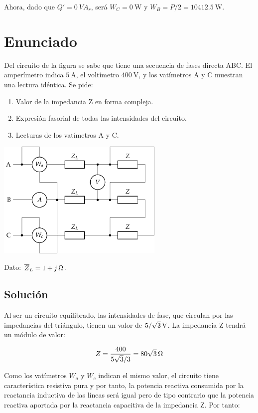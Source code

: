 Ahora, dado que $Q' = \SI{0}{VA}_r$, será $W_C = \SI{0}{\watt}$ y
$W_B = P/2 = \SI{10412.5}{\watt}$.



\section{Enunciado}

Del circuito de la figura se sabe que tiene una secuencia de fases
directa ABC. El amperímetro indica $\SI{5}{\ampere}$, el voltímetro
$\SI{400}{\volt}$, y los vatímetros A y C muestran una lectura
idéntica. Se pide:

\begin{enumerate}
\item Valor de la impedancia Z en forma compleja.
\item Expresión fasorial de todas las intensidades del circuito.
\item Lecturas de los vatímetros A y C.
\end{enumerate}

\begin{center}
  \includegraphics[width = 0.6\textwidth]{figuras/BT3_12}
\end{center}

Dato: $\overline{Z}_L = \SI[parse-numbers = false]{1 + j}{\ohm}$.

\subsection*{Solución}

Al ser un circuito equilibrado, las intensidades de fase, que
circulan por las impedancias del triángulo, tienen un valor de
$\SI[parse-numbers=false]{5/\sqrt{3}}{\volt}$. La impedancia Z
tendrá un módulo de valor:

\[
  Z = \frac{400}{5\sqrt{3}/3} =
  \SI[parse-numbers=false]{80\sqrt{3}}{\ohm}
\]

Como los vatímetros $W_a$ y $W_c$ indican el mismo valor, el
circuito tiene característica resistiva pura y por tanto, la
potencia reactiva consumida por la reactancia inductiva de las
líneas será igual pero de tipo contrario que la potencia reactiva
aportada por la reactancia capacitiva de la impedancia Z. Por tanto:

